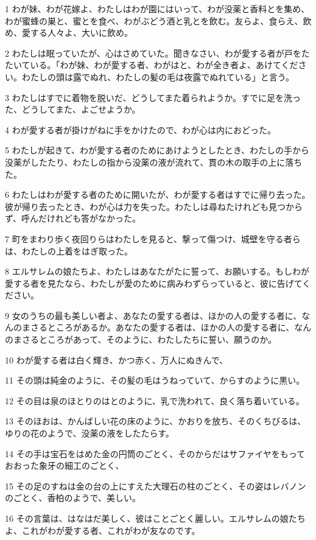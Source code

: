 \par 1 わが妹、わが花嫁よ、わたしはわが園にはいって、わが没薬と香料とを集め、わが蜜蜂の巣と、蜜とを食べ、わがぶどう酒と乳とを飲む。友らよ、食らえ、飲め、愛する人々よ、大いに飲め。
\par 2 わたしは眠っていたが、心はさめていた。聞きなさい、わが愛する者が戸をたたいている。「わが妹、わが愛する者、わがはと、わが全き者よ、あけてください。わたしの頭は露でぬれ、わたしの髪の毛は夜露でぬれている」と言う。
\par 3 わたしはすでに着物を脱いだ、どうしてまた着られようか。すでに足を洗った、どうしてまた、よごせようか。
\par 4 わが愛する者が掛けがねに手をかけたので、わが心は内におどった。
\par 5 わたしが起きて、わが愛する者のためにあけようとしたとき、わたしの手から没薬がしたたり、わたしの指から没薬の液が流れて、貫の木の取手の上に落ちた。
\par 6 わたしはわが愛する者のために開いたが、わが愛する者はすでに帰り去った。彼が帰り去ったとき、わが心は力を失った。わたしは尋ねたけれども見つからず、呼んだけれども答がなかった。
\par 7 町をまわり歩く夜回りらはわたしを見ると、撃って傷つけ、城壁を守る者らは、わたしの上着をはぎ取った。
\par 8 エルサレムの娘たちよ、わたしはあなたがたに誓って、お願いする。もしわが愛する者を見たなら、わたしが愛のために病みわずらっていると、彼に告げてください。
\par 9 女のうちの最も美しい者よ、あなたの愛する者は、ほかの人の愛する者に、なんのまさるところがあるか。あなたの愛する者は、ほかの人の愛する者に、なんのまさるところがあって、そのように、わたしたちに誓い、願うのか。
\par 10 わが愛する者は白く輝き、かつ赤く、万人にぬきんで、
\par 11 その頭は純金のように、その髪の毛はうねっていて、からすのように黒い。
\par 12 その目は泉のほとりのはとのように、乳で洗われて、良く落ち着いている。
\par 13 そのほおは、かんばしい花の床のように、かおりを放ち、そのくちびるは、ゆりの花のようで、没薬の液をしたたらす。
\par 14 その手は宝石をはめた金の円筒のごとく、そのからだはサファイヤをもっておおった象牙の細工のごとく、
\par 15 その足のすねは金の台の上にすえた大理石の柱のごとく、その姿はレバノンのごとく、香柏のようで、美しい。
\par 16 その言葉は、はなはだ美しく、彼はことごとく麗しい。エルサレムの娘たちよ、これがわが愛する者、これがわが友なのです。

